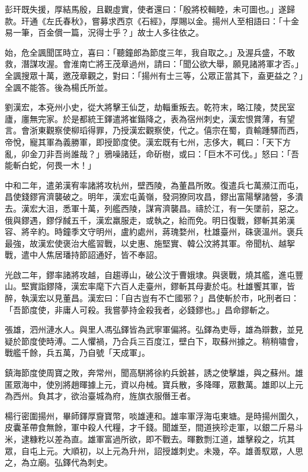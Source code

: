 \begin{pinyinscope}
 彭玕既失援，厚結馬殷，且觀虛實，使者還曰：「殷將校輯睦，未可圖也。」遂歸款。玕通《左氏春秋》，嘗募求西京《石經》，厚賜以金。揚州人至相語曰：「十金易一筆，百金償一篇，況得士乎？」故士人多往依之。



 始，危全諷聞匡時立，喜曰：「聽鐘郎為節度三年，我自取之。」及渥兵盛，不敢救，潛謀攻渥。會淮南亡將王茂章過州，請曰：「聞公欲大舉，願見諸將軍才否。」全諷搜眾十萬，邀茂章觀之，對曰：「揚州有士三等，公眾正當其下，盍更益之？」全諷不能答。後為楊氏所並。



 劉漢宏，本兗州小史，從大將擊王仙芝，劫輜重叛去。乾符末，略江陵，焚民室廬，廛無完家。於是都統王鐸遣將崔鍇降之，表為宿州刺史，漢宏恨賞薄，有望言。會浙東觀察使柳瑫得罪，乃授漢宏觀察使，代之。僖宗在蜀，貢輸踵驛而西，帝悅，寵其軍為義勝軍，即授節度使。漢宏既有七州，志侈大，輒曰：「天下方亂，卯金刀非吾尚誰哉？」鴉噪諸廷，命斫樹，或曰：「巨木不可伐。」怒曰：「吾能斬白蛇，何畏一木！」



 中和二年，遣弟漢宥率諸將攻杭州，壁西陵，為董昌所敗。復遣兵七萬瀕江而屯，昌使錢鏐宵濟襲破之。明年，漢宏屯黃嶺，發洞獠同攻昌，鏐出富陽擊諸營，多潰去。漢宏大沮，悉軍十萬，列艦西陵，謀宵濟襲昌。禱於江，有一矢墜前，惡之。俄與鏐遇，鏐俘馘五千，漢宏羸服走，或執之，紿而免。明日復戰，鏐斬其弟漢容、將辛約。時鐘季文守明州，盧約處州，蔣瑰婺州，杜雄臺州，硃褒溫州。褒兵最強，故漢宏使褒治大艦習戰，以史惠、施堅實、韓公汶將其軍。帝聞杭、越挐戰，遣中人焦居璠持節詔通好，皆不奉詔。



 光啟二年，鏐率諸將攻越，自趨導山，破公汶于曹娥埭。與褒戰，燒其艦，進屯豐山。堅實詣鏐降，漢宏率麾下六百人走臺州，鏐斬其母妻於屯。杜雄饗其軍，皆醉，執漢宏以見董昌。漢宏曰：「自古豈有不亡國邪？」昌使斬於市，叱刑者曰：「吾節度使，非庸人可殺。我嘗夢持金殺我者，必錢鏐也。」昌命鏐斬之。



 張雄，泗州漣水人。與里人馮弘鐸皆為武寧軍偏將。弘鐸為吏辱，雄為辯數，並見疑於節度使時溥。二人懼禍，乃合兵三百度江，壁白下，取蘇州據之。稍稍嘯會，戰艦千餘，兵五萬，乃自號「天成軍」。



 鎮海節度使周寶之敗，奔常州，聞高駢將徐約兵銳甚，誘之使擊雄，與之蘇州。雄匿眾海中，使別將趙暉據上元，資以舟械。寶兵散，多降暉，眾數萬。雄即以上元為西州。負其才，欲治臺城為府，旌旗衣服僭王者。



 楊行密圍揚州，畢師鐸厚齎寶幣，啖雄連和。雄率軍浮海屯東塘。是時揚州圍久，皮囊革帶食無餘，軍中殺人代糧，才千錢。聞雄至，間道挾珍走軍，以銀二斤易斗米，逮糠籺以差為直。雄軍富過所欲，即不戰去。暉數剽江道，雄擊殺之，坑其眾，自屯上元。大順初，以上元為升州，詔授雄刺史。未幾，卒。雄善馭眾，人思之，為立廟。弘鐸代為刺史。




\end{pinyinscope}
